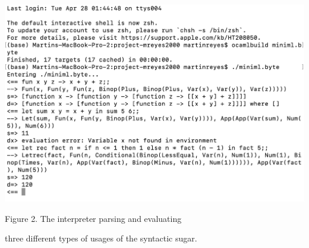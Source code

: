 \documentclass[12pt]{amsart}
\theoremstyle{definition}
\theoremstyle{remark}
\begin{document}
\begin{enumerate}
	\\
	\centerline{\includegraphics[scale=0.63]{minimlparser}}
	\centerline{Figure 2. The interpreter parsing and evaluating}
	\centerline{three different types of usages of the syntactic sugar.}\\


\end{enumerate}
\end{document}

